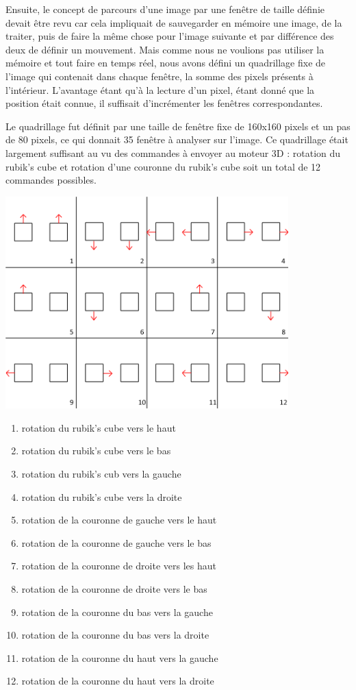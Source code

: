 \documentclass[10pt,a4paper]{report}
\begin{document}
Ensuite, le concept de parcours d'une image par une fenêtre de taille définie devait être revu car cela impliquait de sauvegarder en mémoire une image, de la traiter, puis de faire la même chose pour l'image suivante et par différence des deux de définir un mouvement. Mais comme nous ne voulions pas utiliser la mémoire et tout faire en temps réel, nous avons défini un quadrillage fixe de l'image qui contenait dans chaque fenêtre, la somme des pixels présents à l'intérieur. L'avantage étant qu'à la lecture d'un pixel, étant donné que la position était connue, il suffisait d'incrémenter les fenêtres correspondantes.

Le quadrillage fut définit par une taille de fenêtre fixe de 160x160 pixels et un pas de 80 pixels, ce qui donnait 35 fenêtre à analyser sur l'image. Ce quadrillage était largement suffisant au vu des commandes à envoyer au moteur 3D : rotation du rubik's cube et rotation d'une couronne du rubik's cube soit un total de 12 commandes possibles.

\begin{center}
\includegraphics[width=310pt]{gfx/schema_motion_sensing.png}
\end{center}

\begin{enumerate}
\item rotation du rubik's cube vers le haut
\item rotation du rubik's cube vers le bas
\item rotation du rubik's cub vers la gauche
\item rotation du rubik's cube vers la droite
\item rotation de la couronne de gauche vers le haut
\item rotation de la couronne de gauche vers le bas
\item rotation de la couronne de droite vers les haut
\item rotation de la couronne de droite vers le bas
\item rotation de la couronne du bas vers la gauche
\item rotation de la couronne du bas vers la droite
\item rotation de la couronne du haut vers la gauche
\item rotation de la couronne du haut vers la droite
\end{enumerate}
\end{document}
